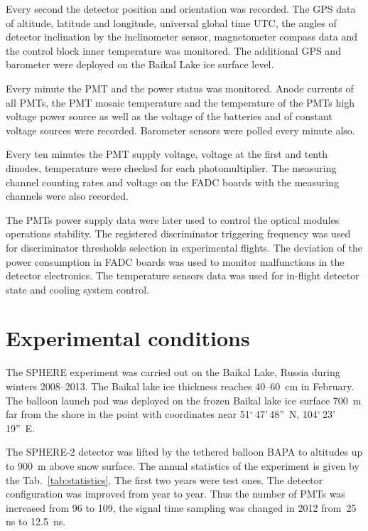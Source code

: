 \documentclass[final,5p,times,twocolumn]{elsarticle}
\begin{document}
Every second the detector position and orientation was recorded. The GPS data of altitude, latitude and longitude, universal global time UTC, the angles of detector inclination by the inclinometer sensor, magnetometer compass data and the control block inner temperature was monitored. The additional GPS and barometer were deployed on the Baikal Lake ice surface level.

Every minute the PMT and the power status was monitored. Anode currents of all PMTs, the PMT mosaic temperature and the temperature of the PMTs high voltage power source as well as the voltage of the batteries and of constant voltage sources were recorded. Barometer sensors were polled every minute also.

Every ten minutes the PMT supply voltage, voltage at the first and tenth dinodes, temperature were checked for each photomultiplier. The measuring channel counting rates and voltage on the FADC boards with the measuring channels were also recorded.

The PMTs power supply data were later used to control the optical modules operations stability. The registered discriminator triggering frequency was used for discriminator thresholds selection in experimental flights. The deviation of the power consumption in FADC boards was used to monitor malfunctions in the detector electronics. The temperature sensors data was used for in-flight detector state and cooling system control.

\section{Experimental conditions}
\label{sect:data}
 
The SPHERE experiment was carried out on the Baikal Lake, Russia during winters 2008--2013. The Baikal lake ice thickness reaches 40--60~cm in February. The balloon launch pad was deployed on the frozen Baikal lake ice surface 700~m far from the shore in the point with coordinates near 51$^\circ$\,47'\,48''~N, 104$^\circ$\,23'\,19''~E. 

The \mbox{SPHERE-2} detector was lifted by the tethered balloon BAPA to altitudes up to 900~m above snow surface. The annual statistics of the experiment is given by the Tab.~\ref{tab:statistics}. The first two years were test ones. The detector configuration was improved from year to year. Thus the number of PMTs was increased from 96 to 109, the signal time sampling was changed in 2012 from~25 ns to 12.5~ns.
\end{document}
